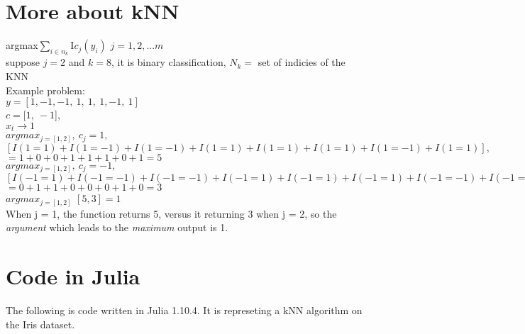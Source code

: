 \section{More about kNN \cite{guo2003knn}}

argmax$\sum_{i \in n_k}^{}$I$c_j(y_i)$ $j={1,2,...m}$ \\
suppose $j=2$ and $k=8$, it is binary classification, $N_k=$ set of indicies of the KNN \\

Example problem: \\
$y=[1,-1,-1, \ 1, \ 1, \ 1,-1, \ 1]$ \\
$c = [1, \ -1$], \\
$x_t \rightarrow 1$ \\
$argmax_{j=[1,2]}, \ c_j=1, $ \\$[I(1=1)+I(1=-1)+I(1=-1)+I(1=1)+I(1=1)+I(1=1)+I(1=-1)+I(1=1)],$ \\
$= 1+0+0+1+1+1+0+1 = 5$\\
$argmax_{j=[1,2]}, \ c_j=-1, $ \\
$[I(-1=1)+I(-1=-1)+I(-1=-1)+I(-1=1)+I(-1=1)+I(-1=1)+I(-1=-1)+I(-1=1)]$ \\
$= 0+1+1+0+0+0+1+0 = 3$\\
$argmax_{j=[1,2]}$ $[5,3]=1$ \\
When j = 1, the function returns 5, versus it returning 3 when j = 2,
so the \textit{argument} which leads to the \textit{maximum} output is
1.


\section{Code in Julia}
The following is code written in Julia 1.10.4. 
It is represeting a kNN algorithm on the Iris dataset.

